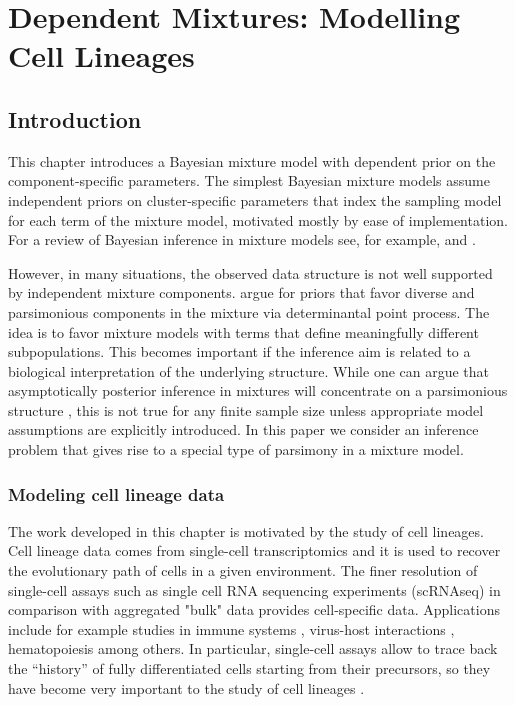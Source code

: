 \chapter{Dependent Mixtures: Modelling Cell Lineages}
\label{ch:cell_lineage}
%


\section{Introduction}

This chapter introduces a Bayesian mixture model with dependent prior on the
component-specific parameters.
The simplest Bayesian mixture models assume independent
priors on cluster-specific parameters that index the sampling model
for each term of the mixture model, motivated mostly by ease of implementation.
For a review of Bayesian inference in mixture models see, for example, \citet{fruhwirth2006finite} and \citet[Chapter 1]{handbookmixtures2019}. 

However, in many situations, the observed data structure is not well supported by independent mixture components.
\citet{xu2016bayesian} argue for priors that favor diverse and parsimonious components in the mixture via determinantal point process. 
The idea is to favor mixture models with terms that define meaningfully different subpopulations. 
This becomes important if the inference aim is related to a biological interpretation of the underlying structure. 
While one can argue that asymptotically posterior inference in mixtures will concentrate on a parsimonious structure \citep{rousseau2011asymptotic}, this is not true for any finite sample size unless appropriate model assumptions are explicitly introduced.
In this paper we consider an inference problem that gives rise to a special type of parsimony in a mixture model.


\subsection{Modeling cell lineage data}
\label{sec:intro_cell_lineage}
The work developed in this chapter is motivated by the study of cell lineages. Cell lineage data comes from single-cell transcriptomics and it is used to recover the evolutionary path of cells in a given environment.
The finer resolution of single-cell assays such as single cell RNA sequencing experiments (scRNAseq) in comparison with aggregated "bulk" data provides cell-specific data. Applications include for example studies in immune systems \citep{stubbington2017single,miragaia2017single}, virus-host interactions \citep{cristinelli2018use}, hematopoiesis \citep{wilson2018single,dharampuriya2017tracking} among others. 
In particular, single-cell assays allow to trace back the ``history'' of fully differentiated cells starting from their precursors, so they have become very important to the study of cell lineages \citep{stubbington2017single}.

